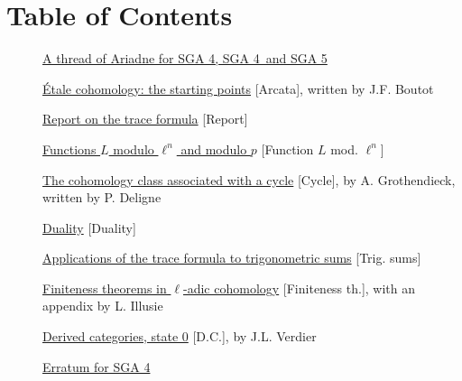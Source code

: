 \chapter*{Table of Contents}
\label{OriginalContents}
\begin{description}
\item[] \hyperref[Ariane]{A thread of Ariadne for SGA 4, SGA 4\textonehalf\ and SGA 5}
\item[] \hyperref[I]{Étale cohomology: the starting points} [Arcata], written by J.F. Boutot
\item[] \hyperref[II]{Report on the trace formula} [Report]
\item[] \hyperref[III]{Functions $L$ modulo $\ell^n$ and modulo $p$} [Function $L$ mod. $\ell^n$]
\item[] \hyperref[IV]{The cohomology class associated with a cycle} [Cycle], by A. Grothendieck, written by P. Deligne
\item[] \hyperref[V]{Duality} [Duality]
\item[] \hyperref[VI]{Applications of the trace formula to trigonometric sums} [Trig. sums]
\item[] \hyperref[VII]{Finiteness theorems in $\ell$-adic cohomology} [Finiteness th.], with an appendix by L. Illusie
\item[] \hyperref[VIII]{Derived categories, state 0} [D.C.], by J.L. Verdier
\item[] \hyperref[ErratumSGA4]{Erratum for SGA 4}
\end{description}
\clearpage
